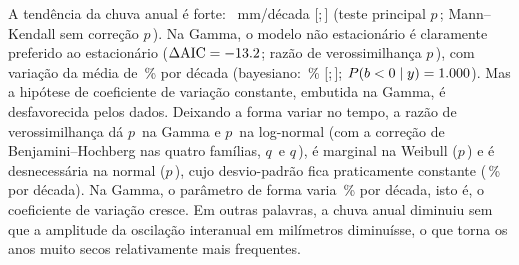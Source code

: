 \documentclass[11pt,a4paper]{article}
\newcommand{\IC}[2]{[#1;\,#2]}            %
\begin{document}
A tendência da chuva anual é forte: \SenChuva{}~mm/década \IC{\SenChuvaICinf}{\SenChuvaICsup}
(teste principal $p$\,\PTFPWChuva; Mann--Kendall sem correção $p$\,\PMKChuva). Na Gamma, o modelo não estacionário é claramente
preferido ao estacionário ($\Delta\mathrm{AIC} = \num{-13.2}$; razão de verossimilhança
$p$\,\NSTempoP), com variação da média de \NSTempoEfeito{}\,\% por década (bayesiano:
\BayesNSEfeito{}\,\% \IC{\BayesNSEfeitoICinf}{\BayesNSEfeitoICsup}; $P(b<0\mid y) =
\num{1.000}$). Mas a hipótese de coeficiente de variação constante, embutida na Gamma, é
desfavorecida pelos dados. Deixando a forma variar no tempo, a razão de verossimilhança dá
$p$\,\PFormaVarGamma{} na Gamma e $p$\,\PFormaVarLogNormal{} na log-normal (com a correção de
Benjamini--Hochberg nas quatro famílias, $q$\,\QFormaVarGamma{} e $q$\,\QFormaVarLogNormal), é marginal
na Weibull ($p$\,\PFormaVarWeibull) e é desnecessária na normal ($p$\,\PFormaVarNormal), cujo
desvio-padrão fica praticamente constante (\EfeitoFormaNormal{}\,\% por década). Na Gamma, o
parâmetro de forma varia \EfeitoFormaGamma{}\,\% por década, isto é, o coeficiente de variação
cresce. Em outras palavras, a chuva anual diminuiu sem que a amplitude da oscilação interanual em
milímetros diminuísse, o que torna os anos muito secos relativamente mais frequentes.
\end{document}
